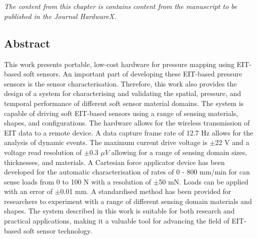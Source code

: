 \chapter{\chapviiname}
\label{chapter7}
\textit{The content from this chapter is contains content from the manuscript to be published in the Journal HardwareX.}


\section{Abstract}
This work presents portable, low-cost hardware for pressure mapping using EIT-based soft sensors. An important part of developing these EIT-based pressure sensors is the sensor characterisation. Therefore, this work also provides the design of a system for characterising and validating the spatial, pressure, and temporal performance of different soft sensor material domains. The system is capable of driving soft EIT-based sensors using a range of sensing materials, shapes, and configurations. The hardware allows for the wireless transmission of EIT data to a remote device. 
A data capture frame rate of 12.7 Hz allows for the analysis of dynamic events. The maximum current drive voltage is $\pm$22 V and a voltage read resolution of $\pm$0.3 $\mu V$ allowing for a range of sensing domain sizes, thicknesses, and materials. A Cartesian force applicator device has been developed for the automatic characterisation of rates of 0 - 800 mm/min for can sense loads from 0 to 100 N with a resolution of $\pm$50 mN. Loads can be applied with an error of $\pm$0.01 mm. A standardised method has been provided for researchers to experiment with a range of different sensing domain materials and shapes. The system described in this work is suitable for both research and practical applications, making it a valuable tool for advancing the field of EIT-based soft sensor technology.


